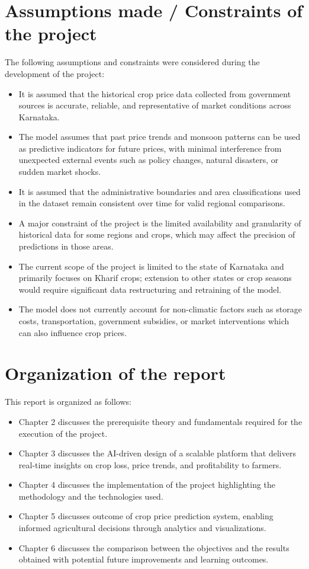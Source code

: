 \section[Assumptions made / Constraints of the project]{\textbf{Assumptions made / Constraints of the project}}

The following assumptions and constraints were considered during the development of the project:

\begin{itemize}
	\item It is assumed that the historical crop price data collected from government sources is accurate, reliable, and representative of market conditions across Karnataka.
	\item The model assumes that past price trends and monsoon patterns can be used as predictive indicators for future prices, with minimal interference from unexpected external events such as policy changes, natural disasters, or sudden market shocks.
	\item It is assumed that the administrative boundaries and area classifications used in the dataset remain consistent over time for valid regional comparisons.
	\item A major constraint of the project is the limited availability and granularity of historical data for some regions and crops, which may affect the precision of predictions in those areas.
	\item The current scope of the project is limited to the state of Karnataka and primarily focuses on Kharif crops; extension to other states or crop seasons would require significant data restructuring and retraining of the model.
	\item The model does not currently account for non-climatic factors such as storage costs, transportation, government subsidies, or market interventions which can also influence crop prices.
\end{itemize}

\section[Organization of the report]{\textbf{Organization of the report}}

This report is organized as follows:
\begin{itemize}
	\item Chapter 2 discusses the prerequisite theory and fundamentals required for the execution of the project.
	\item Chapter 3 discusses the AI-driven design of a scalable platform that delivers real-time insights on crop loss, price trends, and profitability to farmers.
	\item Chapter 4 discusses the implementation of the project highlighting the methodology and the technologies used.
	\item Chapter 5 discusses outcome of crop price prediction system, enabling informed agricultural decisions through analytics and visualizations.
	\item Chapter 6 discusses the comparison between the objectives and the results obtained with potential future improvements and learning outcomes.
\end{itemize}